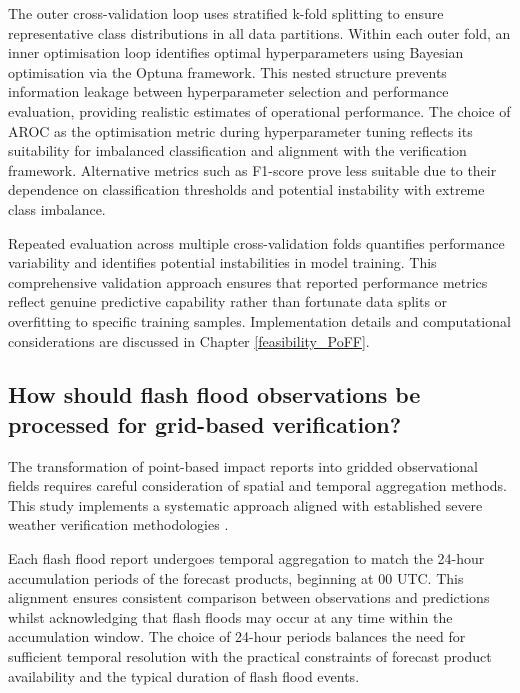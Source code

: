 The outer cross-validation loop uses stratified k-fold splitting to ensure representative class distributions in all data partitions. Within each outer fold, an inner optimisation loop identifies optimal hyperparameters using Bayesian optimisation via the Optuna framework. This nested structure prevents information leakage between hyperparameter selection and performance evaluation, providing realistic estimates of operational performance.
The choice of AROC as the optimisation metric during hyperparameter tuning reflects its suitability for imbalanced classification and alignment with the verification framework. Alternative metrics such as F1-score prove less suitable due to their dependence on classification thresholds and potential instability with extreme class imbalance.

Repeated evaluation across multiple cross-validation folds quantifies performance variability and identifies potential instabilities in model training. This comprehensive validation approach ensures that reported performance metrics reflect genuine predictive capability rather than fortunate data splits or overfitting to specific training samples. Implementation details and computational considerations are discussed in Chapter \ref{feasibility_PoFF}.


\subsection{How should flash flood observations be processed for grid-based verification?}

The transformation of point-based impact reports into gridded observational fields requires careful consideration of spatial and temporal aggregation methods. This study implements a systematic approach aligned with established severe weather verification methodologies \citep{Tsonevsky_2018, Pillosu_2024}.

Each flash flood report undergoes temporal aggregation to match the 24-hour accumulation periods of the forecast products, beginning at 00 UTC. This alignment ensures consistent comparison between observations and predictions whilst acknowledging that flash floods may occur at any time within the accumulation window. The choice of 24-hour periods balances the need for sufficient temporal resolution with the practical constraints of forecast product availability and the typical duration of flash flood events.

